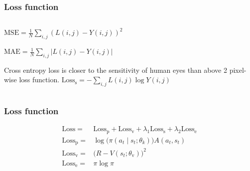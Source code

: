 \documentclass[12pt, aspectratio = 169, xcolor = x11names]{beamer}
\begin{document}
\begin{frame}
  \frametitle{Loss function}
  \begin{columns}
    \pause%
    \begin{column}{0.5\textwidth}
      \begin{definition}
        $\mathrm{MSE} = \frac{1}{N}\sum_{i, j} {(L(i, j) - Y(i, j))}^2$
      \end{definition}
      \pause%
      \begin{definition}
        $\mathrm{MAE} = \frac{1}{N}\sum_{i, j} \lvert L(i, j) - Y(i, j)\rvert$
      \end{definition}
      \pause%
      \begin{definition}
        Cross entropy loss is closer to the sensitivity of human eyes than
        above 2 pixel-wise loss function.
        $\mathrm{Loss}_\mathrm{s} = -\sum_{i, j} L(i, j)\log Y(i, j)$
      \end{definition}
    \end{column}
  \end{columns}
\end{frame}

\begin{frame}
  \frametitle{Loss function}
  \begin{align*}
    \mathrm{Loss} = & \mathrm{Loss}_\mathrm{p} + \mathrm{Loss}_\mathrm{v} + \lambda_1\mathrm{Loss}_\mathrm{s} + \lambda_2\mathrm{Loss}_\mathrm{e}\\
    \mathrm{Loss}_\mathrm{p} = & \log \bigl(\pi(a_t\mid s_t; \theta_k)\bigr)A(a_t, s_t)\\
    \mathrm{Loss}_\mathrm{v} = & {\bigl(R - V(s_t; \theta_\mathrm{v})\bigr)}^2\\
    \mathrm{Loss}_\mathrm{e} = & \pi\log\pi
  \end{align*}
\end{frame}
\end{document}
